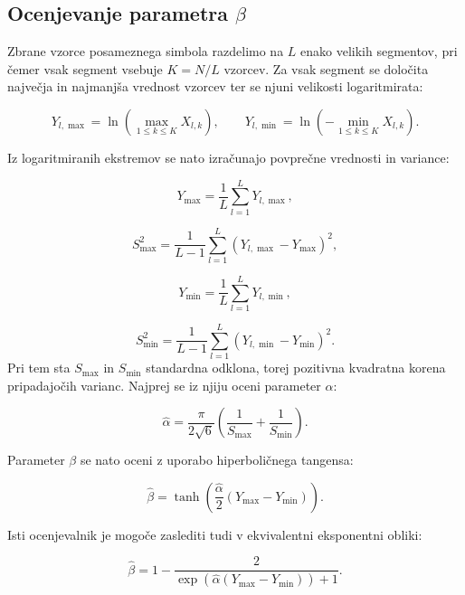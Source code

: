 \documentclass[a4paper, 12pt, openany]{book}
\begin{document}
\subsection{Ocenjevanje parametra $\beta$}
\begin{tcolorbox}[breakable,colback=blue!5!white,colframe=blue!50!black,
title=Postopek 2: Ocenjevanje parametra $\beta$]
\label{met:beta_estimator}
Zbrane vzorce posameznega simbola razdelimo na $L$ enako velikih segmentov, pri čemer vsak segment vsebuje $K=N/L$ vzorcev. Za vsak segment se določita največja in najmanjša vrednost vzorcev ter se njuni velikosti logaritmirata:

\begin{equation}
Y_{l,\max}=\ln\!\left(\max_{1\leq k\leq K} X_{l,k}\right),
\qquad
Y_{l,\min}=\ln\!\left(-\min_{1\leq k\leq K} X_{l,k}\right).
\end{equation}

Iz logaritmiranih ekstremov se nato izračunajo povprečne vrednosti in variance:

\begin{equation}
Y_{\max}=\frac{1}{L}\sum_{l=1}^{L}Y_{l,\max},
\end{equation}

\begin{equation}
S^2_{\max}=\frac{1}{L-1}\sum_{l=1}^{L}(Y_{l,\max}-Y_{\max})^2,
\end{equation}

\begin{equation}
Y_{\min}=\frac{1}{L}\sum_{l=1}^{L}Y_{l,\min},
\end{equation}

\begin{equation}
S^2_{\min}=\frac{1}{L-1}\sum_{l=1}^{L}(Y_{l,\min}-Y_{\min})^2.
\end{equation}
Pri tem sta $S_{\max}$ in $S_{\min}$ standardna odklona, torej pozitivna kvadratna korena pripadajočih varianc. Najprej se iz njiju oceni parameter $\alpha$:

\begin{equation}
\hat{\alpha}
=
\frac{\pi}{2\sqrt{6}}
\left(
\frac{1}{S_{\max}}
+
\frac{1}{S_{\min}}
\right).
\end{equation}

Parameter $\beta$ se nato oceni z uporabo hiperboličnega tangensa:

\begin{equation}
\hat{\beta}
=
\tanh\!\left(
\frac{\hat{\alpha}}{2}
(Y_{\max}-Y_{\min})
\right).
\end{equation}

Isti ocenjevalnik je mogoče zaslediti tudi v ekvivalentni eksponentni obliki:

\begin{equation}
\hat{\beta}
=
1-
\frac{2}
{\exp\!\left(\hat{\alpha}(Y_{\max}-Y_{\min})\right)+1}.
\end{equation}
\end{tcolorbox}
\end{document}
